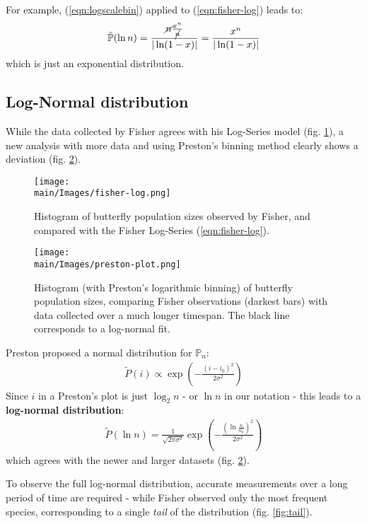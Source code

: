 \documentclass[../../main.tex]{subfiles}
\begin{document}
For example, (\ref{eqn:logscalebin}) applied to (\ref{eqn:fisher-log}) leads to:
\begin{align*}
    \tilde{\mathbb{P}}(\ln n) = \frac{\cancel{n} \frac{x^n}{\cancel{n}}}{|\ln(1-x)|} = \frac{x^n}{|\ln(1-x)|} 
\end{align*}
which is just an exponential distribution.

\subsection{Log-Normal distribution}
While the data collected by Fisher agrees with his Log-Series model (fig. \ref{fig:fisher-log}), a new analysis with more data and using Preston's binning method clearly shows a deviation (fig. \ref{fig:preston-plot}).

\begin{figure}[H]
    \centering
    \texttt{[image: \\main/Images/fisher-log.png]}
    \caption{Histogram of butterfly population sizes observed by Fisher, and compared with the Fisher Log-Series (\ref{eqn:fisher-log}).}
    \label{fig:fisher-log}
\end{figure}

\begin{figure}[H]
    \centering
    \texttt{[image: \\main/Images/preston-plot.png]}
    \caption{Histogram (with Preston's logarithmic binning) of butterfly population sizes, comparing Fisher observations (darkest bars) with data collected over a much longer timespan. The black line corresponds to a log-normal fit.}
    \label{fig:preston-plot}
\end{figure}

Preston proposed a normal distribution for $\mathbb{P}_n$:
\begin{align*}
    \tilde{P}(i) \propto \exp\left(-\frac{(i-i_0)^2}{2 \sigma^2} \right)
\end{align*}
Since $i$ in a Preston's plot is just $\log_2 n$ - or $\ln n$ in our notation - this leads to a \textbf{log-normal distribution}:
\begin{align}\label{eqn:log-normal-dist}
    \tilde{P}(\ln n) = \frac{1}{\sqrt{2 \pi \sigma^2}}  \exp\left(-\frac{\left(\ln \frac{n}{n_0} \right)^2}{2 \sigma^2} \right)
\end{align}
which agrees with the newer and larger datasets (fig. \ref{fig:preston-plot}).

\medskip

To observe the full log-normal distribution, accurate measurements over a long period of time are required - while Fisher observed only the most frequent species, corresponding to a single \textit{tail} of the distribution (fig. \ref{fig:tail}).
\end{document}
